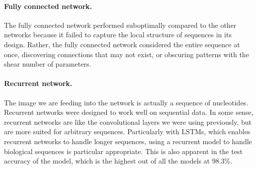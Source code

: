 \documentclass{article}[11pt]
\begin{document}
\paragraph{Fully connected network.} The fully connected network
performed suboptimally compared to the other networks because
it failed to capture the local structure of sequences
in its design. Rather, the fully connected network considered
the entire sequence at once, discovering connections that
may not exist, or obscuring patterns with the shear
number of parameters.

\paragraph{Recurrent network.} The image we are feeding into
the network is actually a sequence of nucleotides. Recurrent
networks were designed to work well on sequential data. In
some sense, recurrent networks are like the convolutional
layers we were using previously, but are more suited for
arbitrary sequences. Particularly with LSTMs, which
enables recurrent networks to handle longer sequences,
using a recurrent model to handle biological sequences
is particular appropriate. This is also apparent in the
test accuracy of the model, which is the highest out of
all the models at 98.3\%.
\end{document}
